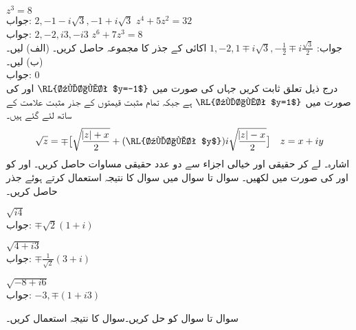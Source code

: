 \quad
$z^3=8$\\
جواب:\quad
$2,-1-i\sqrt{3},-1+i\sqrt{3}$
\quad
$z^4+5z^2=32$\\
جواب:\quad
$2,-2,i3,-i3$
\quad
$z^6+7z^3=8$\\
جواب:\quad
$1,-2,1\mp i \sqrt{3},-\tfrac{1}{2}\mp i \tfrac{\sqrt{3}}{2}$
\quad
اکائی کے  جذر کا مجموعہ حاصل کریں۔ (الف)  لیں۔ (ب)  لیں۔\\
جواب:\quad 
$0$
\quad {}\\
درج ذیل تعلق ثابت کریں جہاں  کی صورت میں 
$\text{\RL{علامت $y=-1$}}$
 اور  کی صورت میں 
$\text{\RL{علامت $y=1$}}$
 ہے جبکہ تمام مثبت قیمتوں کے جذر مثبت علامت کے ساتھ لئے گئے ہیں۔ 
\begin{align*}
\sqrt{z}=\mp\big[\sqrt{\frac{\abs{z}+x}{2}}+(\text{\RL{علامت $y$}})i\sqrt{\frac{\abs{z}-x}{2}}\big]\quad z=x+iy
\end{align*}
اشارہ۔  لے کر حقیقی اور خیالی اجزاء سے دو عدد حقیقی مساوات حاصل کریں۔ اور  کو  اور  کی صورت میں لکھیں۔
سوال  تا سوال  میں سوال  کا نتیجہ استعمال کرتے ہوئے جذر حاصل کریں۔

\quad
$\sqrt{i4}$\\
جواب:\quad
$\mp \sqrt{2}(1+i)$

\quad
$\sqrt{4+i3}$\\
جواب:\quad
$\mp \tfrac{1}{\sqrt{2}}(3+i)$

\quad
$\sqrt{-8+i6}$\\
جواب:\quad
$-3,\mp(1+i3)$

سوال  تا سوال  کو حل کریں۔سوال  کا نتیجہ استعمال کریں۔


